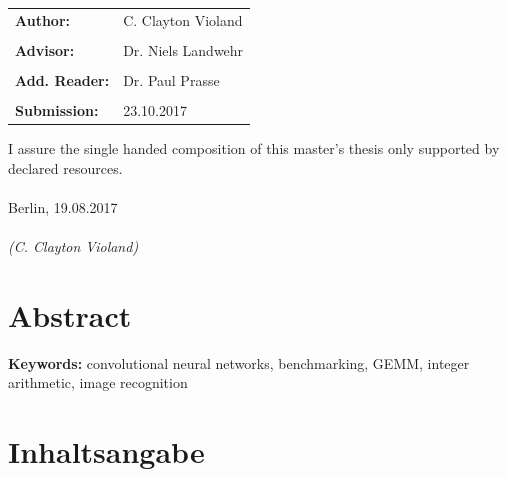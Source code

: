 \documentclass[12pt]{report}
\begin{document}
\vfill

\begin{tabular}{ll}
{\Large \bf Author:} & {\Large C. Clayton Violand} \\\\
{\Large \bf Advisor:} & {\Large Dr. Niels Landwehr} \\\\
{\Large \bf Add. Reader:} & {\Large Dr. Paul Prasse} \\\\
{\Large \bf Submission:} & {\Large 23.10.2017}
\end{tabular}

\newpage	
\thispagestyle{empty}
\hoffset=0mm
\vspace*{\fill}
\noindent I assure the single handed composition of this master's thesis only supported by declared resources.\\\\
Berlin, 19.08.2017\\\\
\noindent \textit{(C. Clayton Violand)}

\newpage
\thispagestyle{empty}
\null

\newpage
\thispagestyle{empty}
\hoffset=0mm
\section*{Abstract}	
\begin{spacing}{1.2}

\end{spacing}

\bigskip
\providecommand{\keywords}[1]{\textbf{Keywords:} #1}
\keywords{convolutional neural networks, benchmarking, GEMM, integer arithmetic, image recognition}

\section*{Inhaltsangabe}
\begin{spacing}{1.2}

\end{spacing}

\newpage
\hoffset=0mm
\setcounter{tocdepth}{3}
\setcounter{secnumdepth}{3}
\fboxsep 0mm

\newpage
\setlength{\baselineskip}{3ex}

\setcounter{page}{1}
\tableofcontents

\newpage
{}
\listoftables\begin{center}\end{center}
\end{document}
